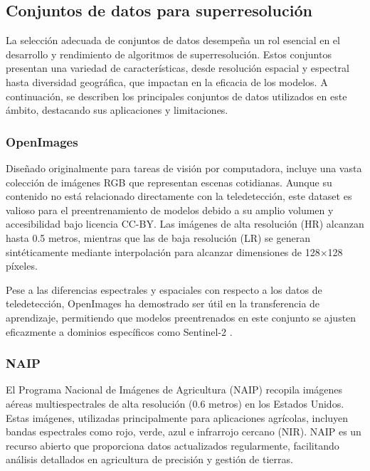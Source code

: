     \subsection{Conjuntos de datos para superresolución}
        \label{chapter:datasets}
        
        La selección adecuada de conjuntos de datos desempeña un rol esencial en el desarrollo y rendimiento de algoritmos de superresolución. Estos conjuntos presentan una variedad de características, desde resolución espacial y espectral hasta diversidad geográfica, que impactan en la eficacia de los modelos. A continuación, se describen los principales conjuntos de datos utilizados en este ámbito, destacando sus aplicaciones y limitaciones.
        
        \subsubsection{OpenImages}
        
            Diseñado originalmente para tareas de visión por computadora, incluye una vasta colección de imágenes RGB que representan escenas cotidianas. Aunque su contenido no está relacionado directamente con la teledetección, este dataset es valioso para el preentrenamiento de modelos debido a su amplio volumen y accesibilidad bajo licencia CC-BY. Las imágenes de alta resolución (HR) alcanzan hasta 0.5 metros, mientras que las de baja resolución (LR) se generan sintéticamente mediante interpolación para alcanzar dimensiones de 128×128 píxeles.
            
            Pese a las diferencias espectrales y espaciales con respecto a los datos de teledetección, OpenImages ha demostrado ser útil en la transferencia de aprendizaje, permitiendo que modelos preentrenados en este conjunto se ajusten eficazmente a dominios específicos como Sentinel-2 \autocite{gargiulo2019fast}.
            
        
        \subsubsection{NAIP}
        
            El Programa Nacional de Imágenes de Agricultura (NAIP) recopila imágenes aéreas multiespectrales de alta resolución (0.6 metros) en los Estados Unidos. Estas imágenes, utilizadas principalmente para aplicaciones agrícolas, incluyen bandas espectrales como rojo, verde, azul e infrarrojo cercano (NIR). NAIP es un recurso abierto que proporciona datos actualizados regularmente, facilitando análisis detallados en agricultura de precisión y gestión de tierras.
            
